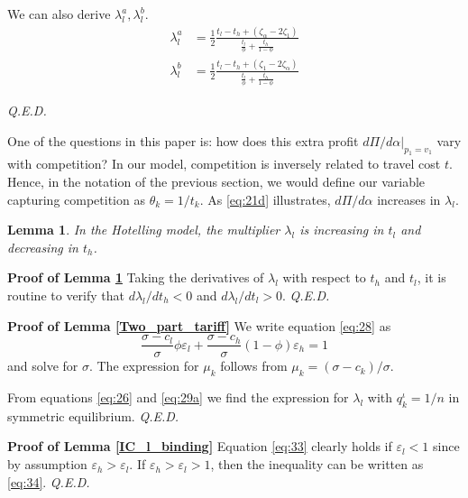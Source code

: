 \documentclass[a4paper,12pt]{article}
\newtheorem{lemma}{Lemma}
\newcommand{\qed}{\hspace*{\fill} {\em Q.E.D.}}
\begin{document}
We can also derive \(\lambda_{l}^a,\lambda_{l}^b\).
\begin{align}
\label{eq:48}
\lambda_{l}^a &= \frac{1}{2} \frac{t_l - t_h + (\zeta_{\alpha} - 2\zeta_1)}{\frac{t_l}{\phi}+\frac{t_h}{1-\phi}} \\
\label{eq:48b}
\lambda_{l}^b &= \frac{1}{2} \frac{t_l - t_h + (\zeta_{1} - 2\zeta_{\alpha})}{\frac{t_l}{\phi}+\frac{t_h}{1-\phi}}
\end{align}

 \qed

One of the questions in this paper is: how does this extra profit \(d\Pi/d\alpha|_{p_1=v_1}\) vary with competition? In our model, competition is inversely related to travel cost \(t\). Hence, in the notation of the previous section, we would define our variable capturing competition as \(\theta_k = 1/t_k\). As \eqref{eq:21d} illustrates, \(d\Pi/d\alpha\) increases in \(\lambda_l\).

\begin{lemma}
\label{Hotelling_lambda}
In the Hotelling model, the multiplier \(\lambda_l\) is increasing in \(t_l\) and decreasing in \(t_h\).
\end{lemma}

\textbf{Proof of Lemma \ref{Hotelling_lambda}}
Taking the derivatives of \(\lambda_l\) with respect to \(t_h\) and \(t_l\), it is routine to verify that \(d\lambda_l/d t_h <0\) and \(d\lambda_l/dt_l > 0\). 
 \qed

\textbf{Proof of Lemma \ref{Two_part_tariff}}
We write equation \eqref{eq:28} as
\begin{equation}
\label{eq:31}
\frac{\sigma-c_l}{\sigma}\phi \varepsilon_l+\frac{\sigma-c_h}{\sigma}(1-\phi) \varepsilon_h = 1
\end{equation}
and solve for \(\sigma\). The expression for \(\mu_k\) follows from \(\mu_k=(\sigma-c_k)/\sigma\).

From equations \eqref{eq:26} and \eqref{eq:29a} we find the expression for \(\lambda_l\) with \(q_k^{\iota}=1/n\) in symmetric equilibrium. 
 \qed


\textbf{Proof of Lemma \ref{IC_l_binding}}
Equation \eqref{eq:33} clearly holds if \(\varepsilon_l < 1\) since by assumption \(\varepsilon_h > \varepsilon_l\).
If \(\varepsilon_{h} > \varepsilon_l > 1\), then the inequality can be written as \eqref{eq:34}. 
 \qed
\end{document}
